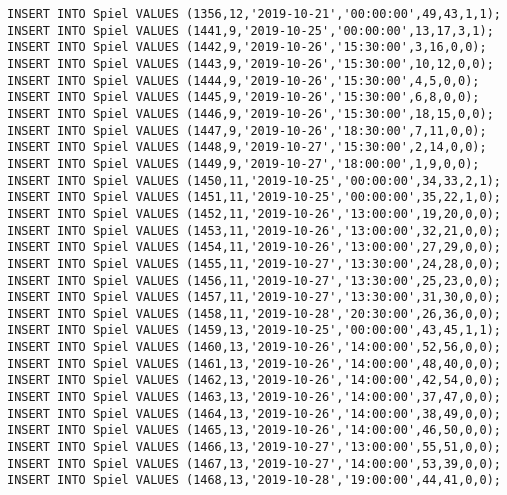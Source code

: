 \documentclass{lehramt-informatik-aufgabe}
\begin{document}
\begin{verbatim}
INSERT INTO Spiel VALUES (1356,12,'2019-10-21','00:00:00',49,43,1,1);
INSERT INTO Spiel VALUES (1441,9,'2019-10-25','00:00:00',13,17,3,1);
INSERT INTO Spiel VALUES (1442,9,'2019-10-26','15:30:00',3,16,0,0);
INSERT INTO Spiel VALUES (1443,9,'2019-10-26','15:30:00',10,12,0,0);
INSERT INTO Spiel VALUES (1444,9,'2019-10-26','15:30:00',4,5,0,0);
INSERT INTO Spiel VALUES (1445,9,'2019-10-26','15:30:00',6,8,0,0);
INSERT INTO Spiel VALUES (1446,9,'2019-10-26','15:30:00',18,15,0,0);
INSERT INTO Spiel VALUES (1447,9,'2019-10-26','18:30:00',7,11,0,0);
INSERT INTO Spiel VALUES (1448,9,'2019-10-27','15:30:00',2,14,0,0);
INSERT INTO Spiel VALUES (1449,9,'2019-10-27','18:00:00',1,9,0,0);
INSERT INTO Spiel VALUES (1450,11,'2019-10-25','00:00:00',34,33,2,1);
INSERT INTO Spiel VALUES (1451,11,'2019-10-25','00:00:00',35,22,1,0);
INSERT INTO Spiel VALUES (1452,11,'2019-10-26','13:00:00',19,20,0,0);
INSERT INTO Spiel VALUES (1453,11,'2019-10-26','13:00:00',32,21,0,0);
INSERT INTO Spiel VALUES (1454,11,'2019-10-26','13:00:00',27,29,0,0);
INSERT INTO Spiel VALUES (1455,11,'2019-10-27','13:30:00',24,28,0,0);
INSERT INTO Spiel VALUES (1456,11,'2019-10-27','13:30:00',25,23,0,0);
INSERT INTO Spiel VALUES (1457,11,'2019-10-27','13:30:00',31,30,0,0);
INSERT INTO Spiel VALUES (1458,11,'2019-10-28','20:30:00',26,36,0,0);
INSERT INTO Spiel VALUES (1459,13,'2019-10-25','00:00:00',43,45,1,1);
INSERT INTO Spiel VALUES (1460,13,'2019-10-26','14:00:00',52,56,0,0);
INSERT INTO Spiel VALUES (1461,13,'2019-10-26','14:00:00',48,40,0,0);
INSERT INTO Spiel VALUES (1462,13,'2019-10-26','14:00:00',42,54,0,0);
INSERT INTO Spiel VALUES (1463,13,'2019-10-26','14:00:00',37,47,0,0);
INSERT INTO Spiel VALUES (1464,13,'2019-10-26','14:00:00',38,49,0,0);
INSERT INTO Spiel VALUES (1465,13,'2019-10-26','14:00:00',46,50,0,0);
INSERT INTO Spiel VALUES (1466,13,'2019-10-27','13:00:00',55,51,0,0);
INSERT INTO Spiel VALUES (1467,13,'2019-10-27','14:00:00',53,39,0,0);
INSERT INTO Spiel VALUES (1468,13,'2019-10-28','19:00:00',44,41,0,0);


\end{verbatim}
\end{document}
